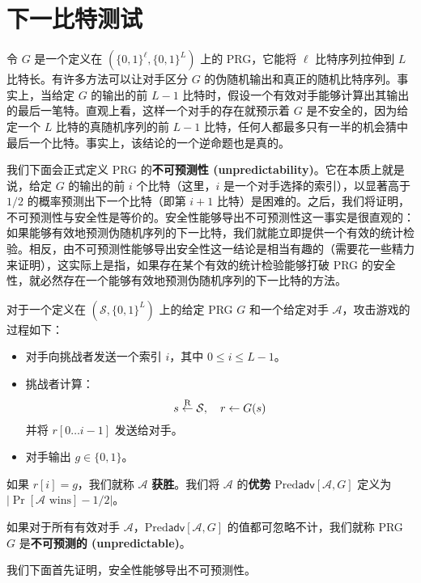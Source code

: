 \section{下一比特测试}\label{sec:3-5}

令 $G$ 是一个定义在 $(\{0,1\}^\ell,\{0,1\}^L)$ 上的 PRG，它能将 $\ell$ 比特序列拉伸到 $L$ 比特长。有许多方法可以让对手区分 $G$ 的伪随机输出和真正的随机比特序列。事实上，当给定 $G$ 的输出的前 $L-1$ 比特时，假设一个有效对手能够计算出其输出的最后一笔特。直观上看，这样一个对手的存在就预示着 $G$ 是不安全的，因为给定一个 $L$ 比特的真随机序列的前 $L-1$ 比特，任何人都最多只有一半的机会猜中最后一个比特。事实上，该结论的一个逆命题也是真的。

我们下面会正式定义 PRG 的\textbf{不可预测性 (unpredictability)}。它在本质上就是说，给定 $G$ 的输出的前 $i$ 个比特（这里，$i$ 是一个对手选择的索引），以显著高于 $1/2$ 的概率预测出下一个比特（即第 $i+1$ 比特）是困难的。之后，我们将证明，不可预测性与安全性是等价的。安全性能够导出不可预测性这一事实是很直观的：如果能够有效地预测伪随机序列的下一比特，我们就能立即提供一个有效的统计检验。相反，由不可预测性能够导出安全性这一结论是相当有趣的（需要花一些精力来证明），这实际上是指，如果存在某个有效的统计检验能够打破 PRG 的安全性，就必然存在一个能够有效地预测伪随机序列的下一比特的方法。

\begin{game}\label{game:3-2}
对于一个定义在 $(\mathcal{S},\{0,1\}^L)$ 上的给定 PRG $G$ 和一个给定对手 $\mathcal{A}$，攻击游戏的过程如下：
\begin{itemize}
	\item 对手向挑战者发送一个索引 $i$，其中 $0\leq i\leq L-1$。
	\item 挑战者计算：
	\[
	s\overset{\rm R}\leftarrow\mathcal{S},
	\quad
	r\leftarrow G(s)
	\]
	并将 $r[0\dots i-1]$ 发送给对手。
	\item 对手输出 $g\in\{0,1\}$。
\end{itemize}
如果 $r[i]=g$，我们就称 $\mathcal{A}$ \textbf{获胜}。我们将 $\mathcal{A}$ 的\textbf{优势} $\mathrm{Pred}\mathsf{adv}[\mathcal{A},G]$ 定义为 $|\Pr[\mathcal{A}\text{ wins}]-1/2|$。
\end{game}

\begin{definition}\label{def:3-3}
如果对于所有有效对手 $\mathcal{A}$，$\mathrm{Pred}\mathsf{adv}[\mathcal{A},G]$ 的值都可忽略不计，我们就称 PRG $G$ 是\textbf{不可预测的 (unpredictable)}。
\end{definition}

我们下面首先证明，安全性能够导出不可预测性。


